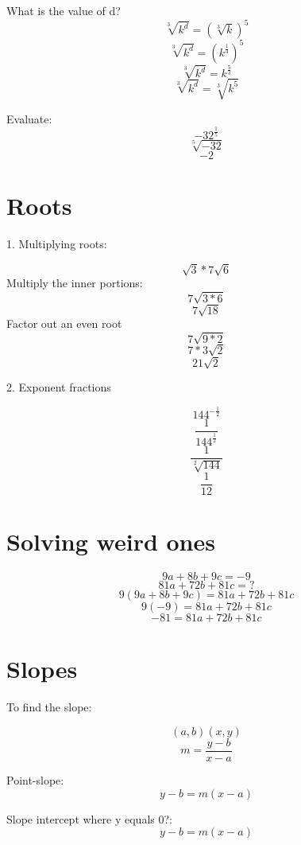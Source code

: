 \documentclass{article}
\begin{document}
What is the value of d?
$$\sqrt[3]{k^{d}} = (\sqrt[3]{k})^{5}$$
$$\sqrt[3]{k^{d}} = (k^{\frac{1}{3}})^{5}$$
$$\sqrt[3]{k^{d}} = k^{\frac{5}{3}}$$
$$\sqrt[3]{k^{d}} = \sqrt[3]{k^{5}}$$

Evaluate:
$$-32^{\frac{1}{5}}$$
$$\sqrt[5]{-32}$$
$$-2$$

\section{Roots}

1. Multiplying roots:

$$\sqrt{3} * 7\sqrt{6}$$
Multiply the inner portions:
$$7\sqrt{3*6}$$
$$7\sqrt{18}$$
Factor out an even root
$$7\sqrt{9*2}$$
$$7*3\sqrt{2}$$
$$21\sqrt{2}$$


2. Exponent fractions

$$144^{-\frac{1}{2}}$$
$$\frac{1}{144^{\frac{1}{2}}}$$
$$\frac{1}{\sqrt[2]{144}}$$
$$\frac{1}{12}$$

\section{Solving weird ones}

$$9a+8b+9c=-9$$
$$81a+72b+81c=?$$
$$9(9a+8b+9c)=81a+72b+81c$$
$$9(-9)=81a+72b+81c$$
$$-81=81a+72b+81c$$

\section{Slopes}

To find the slope:

$$(a,b)(x,y)$$
$$m = \frac{y-b}{x-a}$$

Point-slope:
$$y-b = m(x-a)$$

Slope intercept where y equals 0?:
$$y-b = m(x-a)$$
\end{document}
